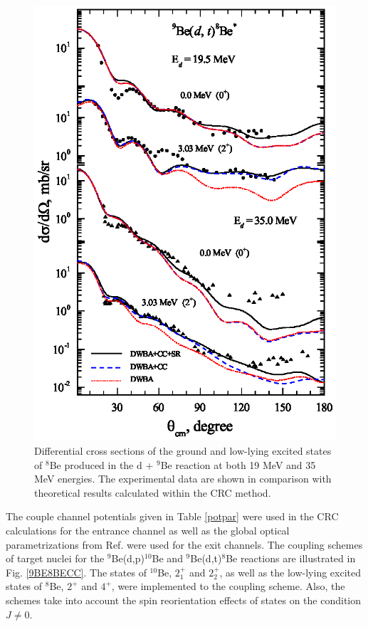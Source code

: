 \documentclass[10pt]{iopart}
\begin{document}
\begin{figure}[tp]
\includegraphics[scale=0.8]{3H8BE.eps}
\caption{
\label{3H8BE}
Differential cross sections of the ground and low-lying excited states of $^{8}$Be produced in the d + $^9$Be reaction at both 19 MeV and 35 MeV energies. The experimental data are shown in comparison with  theoretical results calculated within the CRC method.}
\end{figure}

The couple channel potentials given in Table \ref{potpar} were used in the CRC calculations for the entrance channel as well as the global optical parametrizations from Ref. \cite{globalProton, globalTriton} were used for the exit channels. The coupling schemes of target nuclei for the ${}^9$Be(d,p)${}^{10}$Be and ${}^9$Be(d,t)${}^8$Be  reactions  are illustrated in Fig. \ref{9BE8BECC}. The states of ${}^{10}$Be, $2^+_{1}$ and $2^+_{2}$, as well as the low-lying excited states of ${}^8$Be, $2^+$ and $4^+$, were implemented to the coupling scheme. Also, the schemes take into account the spin reorientation effects of states on the condition $J \neq 0$.
\end{document}

